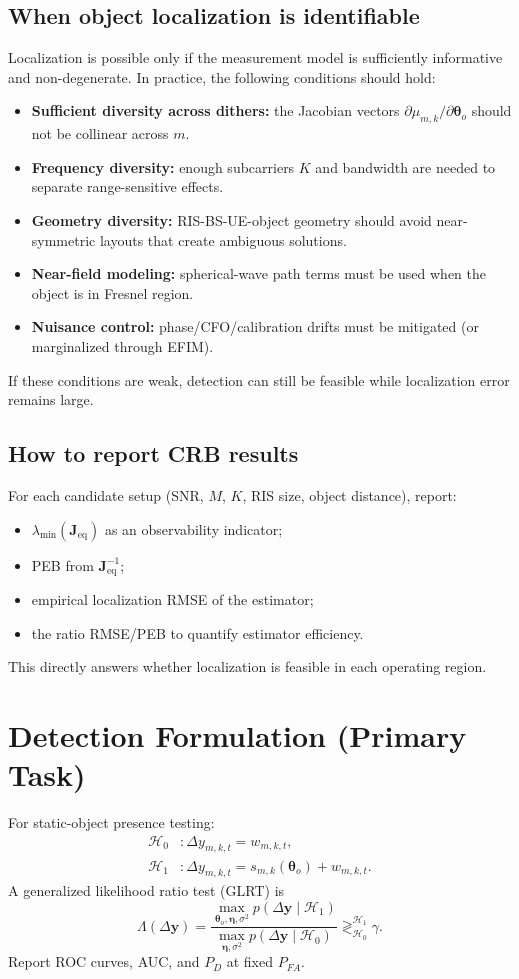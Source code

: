 \documentclass[11pt,a4paper]{article}
\begin{document}
\subsection{When object localization is identifiable}
Localization is possible only if the measurement model is sufficiently informative and non-degenerate. In practice, the following conditions should hold:
\begin{itemize}
\item \textbf{Sufficient diversity across dithers:} the Jacobian vectors $\partial \mu_{m,k}/\partial \bm{\theta}_o$ should not be collinear across $m$.
\item \textbf{Frequency diversity:} enough subcarriers $K$ and bandwidth are needed to separate range-sensitive effects.
\item \textbf{Geometry diversity:} RIS-BS-UE-object geometry should avoid near-symmetric layouts that create ambiguous solutions.
\item \textbf{Near-field modeling:} spherical-wave path terms must be used when the object is in Fresnel region.
\item \textbf{Nuisance control:} phase/CFO/calibration drifts must be mitigated (or marginalized through EFIM).
\end{itemize}
If these conditions are weak, detection can still be feasible while localization error remains large.

\subsection{How to report CRB results}
For each candidate setup (SNR, $M$, $K$, RIS size, object distance), report:
\begin{itemize}
\item $\lambda_{\min}(\mathbf{J}_{\mathrm{eq}})$ as an observability indicator;
\item PEB from $\mathbf{J}_{\mathrm{eq}}^{-1}$;
\item empirical localization RMSE of the estimator;
\item the ratio RMSE/PEB to quantify estimator efficiency.
\end{itemize}
This directly answers whether localization is feasible in each operating region.

\section{Detection Formulation (Primary Task)}
For static-object presence testing:
\begin{align}
\mathcal{H}_0 &: \Delta y_{m,k,t} = w_{m,k,t},\\
\mathcal{H}_1 &: \Delta y_{m,k,t} = s_{m,k}(\bm{\theta}_o)+w_{m,k,t}.
\end{align}
A generalized likelihood ratio test (GLRT) is
\begin{equation}
\Lambda(\Delta\mathbf{y})=
\frac{\max_{\bm{\theta}_o,\bm{\eta},\sigma^2} p(\Delta\mathbf{y}\mid\mathcal{H}_1)}
{\max_{\bm{\eta},\sigma^2} p(\Delta\mathbf{y}\mid\mathcal{H}_0)}
\gtrless_{\mathcal{H}_0}^{\mathcal{H}_1}\gamma.
\end{equation}
Report ROC curves, AUC, and $P_D$ at fixed $P_{FA}$.
\end{document}
